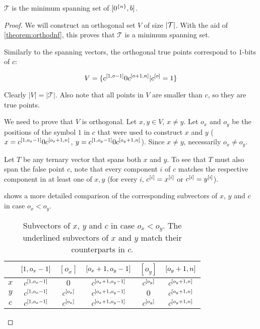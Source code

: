 \begin{theorem}[Optimality]
\label{proof:prefixoptimal}
$\mathcal{T}$ is the minimum spanning set of
$[0^{\{n\}}, b]$.
\end{theorem}

\begin{proof}
We will construct an orthogonal set $V$
of size $\lvert\mathcal{T}\rvert$.
With the aid of \autoref{theorem:orthodnf},
this proves that $\mathcal{T}$ is a minimum spanning set.

Similarly to the spanning vectors,
the orthogonal true points correspond to $1$-bits of $c$:

\[
V =
\{c^{[1, o - 1]} 0 c^{[o + 1, n]}
| c^{[o]} = 1\}
\]

Clearly $|V| = |\mathcal{T}|$.
Also note that all points in $V$ are smaller than $c$,
so they are true points.

We need to prove that $V$ is orthogonal.
Let $x, y \in V$, $x \neq y$.
Let $o_x$ and $o_y$ be the positions of the symbol $1$
in $c$
that were used to construct $x$ and $y$
($x = c^{[1, o_x - 1]} 0 c^{[o_x + 1, n]}$,
$y = c^{[1, o_y - 1]} 0 c^{[o_y + 1, n]}$).
Since $x \neq y$, necessarily $o_x \neq o_y$.

Let $T$ be any ternary vector that spans both $x$ and $y$.
To see that $T$ must also span the false point $c$,
note that every component $i$ of $c$
matches the respective component in at least one of $x,y$
(for every $i$,
$c^{[i]} = x^{[i]}$ or $c^{[i]} = y^{[i]}$).

shows a more detailed comparison
of the corresponding subvectors of $x$, $y$ and $c$
in case $o_x < o_y$.

\begin{table}[h]
\centering
\begin{tabular}{c|ccccc}
& $[1, o_x - 1]$ & $[o_x]$
& $[o_x + 1, o_y - 1]$ & $[o_y]$
& $[o_y + 1, n]$ \\
\hline
$x$
& \underline{$c^{[1, o_x - 1]}$}
& $0$
& \underline{$c^{[o_x + 1, o_y - 1]}$}
& \underline{$c^{[o_y]}$}
& \underline{$c^{[o_y + 1, n]}$} \\
$y$
& \underline{$c^{[1, o_x - 1]}$}
& \underline{$c^{[o_x]}$}
& \underline{$c^{[o_x + 1, o_y - 1]}$}
& $0$
& \underline{$c^{[o_y + 1, n]}$} \\
\hline
$c$
& $c^{[1, o_x - 1]}$
& $c^{[o_x]}$
& $c^{[o_x + 1, o_y - 1]}$
& $c^{[o_y]}$
& $c^{[o_y + 1, n]}$
\end{tabular}
\caption[Subvectors of $x$, $y$ and $c$
in case $o_x < o_y$]
{Subvectors of $x$, $y$ and $c$
in case $o_x < o_y$.
The underlined subvectors of $x$ and $y$
match their counterparts in $c$.}
\label{tab:xyc}
\end{table}


\end{proof}
